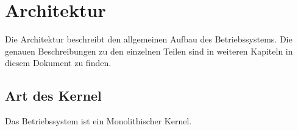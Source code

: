 \section{Architektur}
Die Architektur beschreibt den allgemeinen Aufbau des Betriebssystems. Die genauen Beschreibungen zu den einzelnen Teilen sind in weiteren Kapiteln in diesem Dokument zu finden.

\subsection{Art des Kernel}
Das Betriebssystem ist ein Monolithischer Kernel. 



\pagebreak 